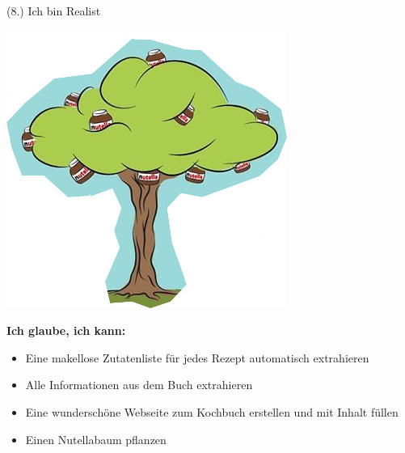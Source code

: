 \documentclass[12pt]{beamer}
\begin{document}
\begin{frame}{(8.) Ich bin Realist}
\begin{minipage}{0.35\textwidth}
		\vspace*{0.2cm}\includegraphics[width=0.9\linewidth]{Images/Nutellabaum}
	\end{minipage}
	\begin{minipage}{0.6\textwidth}
		\textbf{Ich glaube, ich kann:}
		\begin{itemize}
			\item Eine makellose Zutatenliste für jedes Rezept automatisch extrahieren
			\item Alle Informationen aus dem Buch extrahieren
			\item Eine wunderschöne Webseite zum Kochbuch erstellen und mit Inhalt füllen

			\vspace*{0.5cm}			
			\item Einen Nutellabaum pflanzen
		\end{itemize}
	\end{minipage}
\end{frame}
\end{document}
